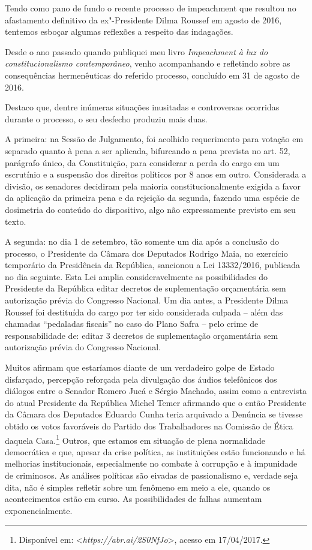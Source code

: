 Tendo como pano de fundo o recente processo de impeachment que
resultou no afastamento definitivo da ex"-Presidente Dilma Roussef em
agosto de 2016, tentemos esboçar algumas reflexões a respeito das
indagações.

Desde o ano passado quando publiquei meu livro \emph{Impeachment à
luz do constitucionalismo contemporâneo}, venho acompanhando e
refletindo sobre as consequências hermenêuticas do referido processo,
concluído em 31 de agosto de 2016.

Destaco que, dentre inúmeras situações inusitadas e controversas
ocorridas durante o processo, o seu desfecho produziu mais duas.

A primeira: na Sessão de Julgamento, foi acolhido requerimento para
votação em separado quanto à pena a ser aplicada, bifurcando a pena
prevista no art. 52, parágrafo único, da Constituição, para considerar a
perda do cargo em um escrutínio e a suspensão dos direitos políticos por
8 anos em outro. Considerada a divisão, os senadores decidiram pela
maioria constitucionalmente exigida a favor da aplicação da primeira
pena e da rejeição da segunda, fazendo uma espécie de dosimetria do
conteúdo do dispositivo, algo não expressamente previsto em seu texto.

A segunda: no dia 1 de setembro, tão somente um dia após a conclusão do
processo, o Presidente da Câmara dos Deputados Rodrigo Maia, no
exercício temporário da Presidência da República, sancionou a Lei
13332/2016, publicada no dia seguinte. Esta Lei amplia consideravelmente
as possibilidades do Presidente da República editar decretos de
suplementação orçamentária sem autorização prévia do Congresso Nacional.
Um dia antes, a Presidente Dilma Roussef foi destituída do cargo por ter
sido considerada culpada -- além das chamadas ``pedaladas fiscais'' no
caso do Plano Safra -- pelo crime de responsabilidade de: editar 3
decretos de suplementação orçamentária sem autorização prévia do
Congresso Nacional.

Muitos afirmam que estaríamos diante de um verdadeiro golpe de Estado
disfarçado, percepção reforçada pela divulgação dos áudios telefônicos
dos diálogos entre o Senador Romero Jucá e Sérgio Machado, assim como a
entrevista do atual Presidente da República Michel Temer afirmando que o
então Presidente da Câmara dos Deputados Eduardo Cunha teria arquivado a
Denúncia se tivesse obtido os votos favoráveis do Partido dos
Trabalhadores na Comissão de Ética daquela Casa.\footnote{Disponível em: \textless{}\emph{https://abr.ai/2S0NfJo}\textgreater{}, acesso em 17/04/2017.} Outros, que estamos em situação de plena
normalidade democrática e que, apesar da crise política, as instituições
estão funcionando e há melhorias institucionais, especialmente no
combate à corrupção e à impunidade de criminosos. As análises políticas
são eivadas de passionalismo e, verdade seja dita, não é simples
refletir sobre um fenômeno em meio a ele, quando os acontecimentos estão
em curso. As possibilidades de falhas aumentam exponencialmente.

